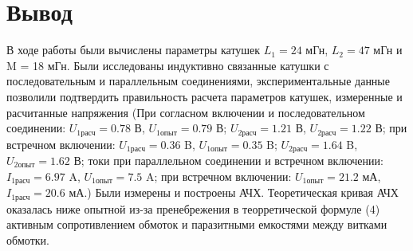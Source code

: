 \documentclass[a4paper,14pt ]{article} %
\begin{document}
\section{Вывод}
В ходе работы были вычислены параметры катушек $L_1 = 24$ мГн, $L_2 = 47$ мГн и M = 18 мГн.
Были исследованы индуктивно связанные катушки с последовательным и параллельным соединениями, экспериментальные
данные позволили подтвердить правильность расчета параметров катушек, измеренные и расчитанные напряжения (При согласном включении и последовательном соединении:
$U_{1\text{расч}} = 0.78$ В, $U_{1\text{опыт}} = 0.79$ В; $U_{2\text{расч}} = 1.21$ В, $U_{2\text{расч}} = 1.22$ В; при встречном включении:
$U_{1\text{расч}} = 0.36$ B, $U_{1\text{опыт}} = 0.35$ B; $U_{2\text{расч}} = 1.64$ B, $ U_{2\text{опыт}} = 1.62$ В; токи при параллельном соединении и встречном включении:
$I_{1\text{расч}} = 6.97$ A, $U_{1\text{опыт}} = 7.5$ A; при встречном включении: $U_{1\text{опыт}} = 21.2$ мА,
$I_{1\text{расч}} = 20.6$ мА.)
Были измерены и построены АЧХ. Теоретическая кривая АЧХ оказалась ниже опытной из-за 
пренебрежения в теорретической формуле (4) активным сопротивлением обмоток и паразитными емкостями между витками обмотки.
\end{document}
